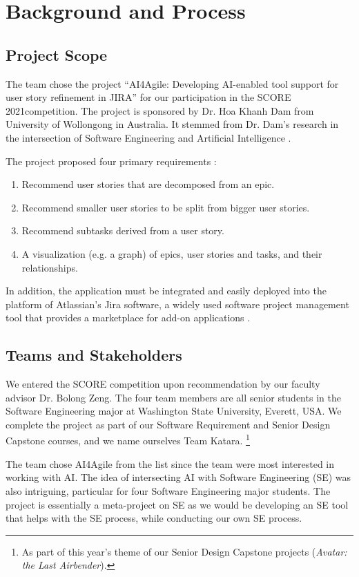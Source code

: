 \section{Background and Process}
\label{background}
\subsection{Project Scope}
\label{scope}
The team chose the project “AI4Agile: Developing AI-enabled tool support for user story refinement in JIRA” for our participation in the SCORE 2021competition. The project is sponsored by Dr. Hoa Khanh Dam from University of Wollongong in Australia. It stemmed from Dr. Dam's research in the intersection of Software Engineering and Artificial Intelligence \cite{dam1,dam2,dam3}. 

The project proposed four primary requirements \cite{proposal}:

\begin{enumerate}
	\item Recommend user stories that are decomposed from an epic.
	\item Recommend smaller user stories to be split from bigger user stories.
	\item Recommend subtasks derived from a user story.
	\item A visualization (e.g. a graph) of epics, user stories and tasks, and their relationships.
\end{enumerate}

In addition, the application must be integrated and easily deployed into the platform of Atlassian’s Jira software, a widely used software project management tool that provides a marketplace for add-on applications \cite{jira1}. 

\subsection{Teams and Stakeholders}
We entered the SCORE competition upon recommendation by our faculty advisor Dr. Bolong Zeng. The four team members are all senior students in the Software Engineering major at Washington State University, Everett, USA. We complete the project as part of our Software Requirement and Senior Design Capstone courses, and we name ourselves Team Katara. \footnote{As part of this year's theme of our Senior Design Capstone projects (\emph{Avatar: the Last Airbender}).} 

The team chose AI4Agile from the list since the team were most interested in working with AI. The idea of intersecting AI with Software Engineering (SE) was also intriguing, particular for four Software Engineering major students. The project is essentially a meta-project on SE as we would be developing an SE tool that helps with the SE process, while conducting our own SE process. 

